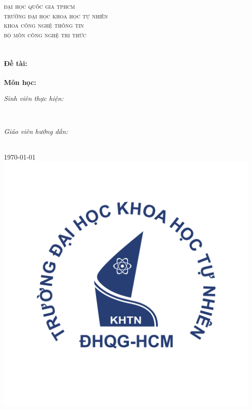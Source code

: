 \begin{titlepage}
\centering

\textsc{\LARGE đại học quốc gia tphcm}\\[0.5cm]
\textsc{\Large trường đại học khoa học tự nhiên}\\[0.5cm]
\textsc{\large khoa công nghệ thông tin}\\[0.5cm]
\textsc{bộ môn công nghệ tri thức}\\[0.5cm]

\HRule \\[0.2cm]
{ 
\huge{\bfseries{\reporttitle}}\\[0.2cm]
\large{\bfseries{Đề tài: \reportname}}
}\\[0.1cm]
\HRule \\[0.2cm]

\textbf{\large Môn học: \coursename}\\[0.5cm]

\begin{minipage}[t]{0.5\textwidth}
\begin{flushleft} 
\large
\emph{Sinh viên thực hiện:}\\
\studentname
\end{flushleft}
\end{minipage}
~
\begin{minipage}[t]{0.3\textwidth}
\begin{flushleft} \large
\emph{Giáo viên hướng dẫn:} \\
\teachername
\end{flushleft}
\end{minipage}\\[1cm]

{\large \today}\\[1cm]

\includegraphics[scale=.20]{img/hcmus-logo.png}\\[1cm] 

\vfill
\end{titlepage}
	